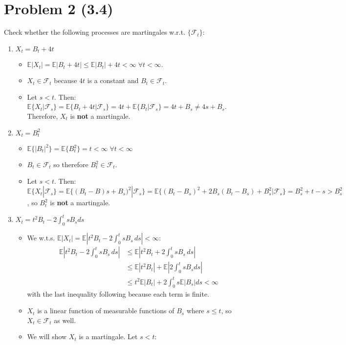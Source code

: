 \documentclass[11pt]{article}
\newcommand{\fcal}{\mathcal{F}}
\newcommand\abs[1]{\left|#1\right|}
\newcommand{\E}{\mathbb{E}}
\newcommand{\seq}[1]{\{#1\}}
\begin{document}
 \section*{Problem 2 (3.4)}
 Check whether the following processes are martingales w.r.t. $\seq{\fcal_t}$:
 \begin{enumerate}
 \item $X _ { t } = B _ { t } + 4 t$\\
 \begin{itemize}
 \item $\E \abs{X_t} = \E \abs{B_t + 4t} \leq \E \abs{B_t} + 4t < \infty \; \forall t<\infty.$
 \item $ X_t \in \fcal_t$ because $4t$ is a constant and $B_t \in \fcal_t$.
 \item Let $s<t$.  Then: $\E\{X_t|\fcal_s\}=\E\{B_t + 4t|\fcal_s\}=4t+\E\{B_t|\fcal_s\}=4t+B_s \neq 4s+ B_s$.  Therefore, $X_t$ is \textbf{not} a martingale.
 \end{itemize}
 \item $X _ { t } = B _ { t } ^ { 2 }$
 \begin{itemize}
 \item $\E\{ \abs{B_t}^2 \} = \E\{B_t^2\} = t<\infty \; \forall t<\infty$
 \item $B_t \in \fcal_t$ so therefore $B_t^2 \in \fcal_t$.
 \item  Let $s<t$.  Then: $\E\{X_t|\fcal_s\}= \E \{(B_t-B)s+B_s)^2|\fcal_s\} = \E \{ (B_t-B_s)^2 + 2 B_s(B_t-B_s) +B_s^2| \fcal_s\} = B_s^2+t-s > B_s^2$, so $B_t^2$ is \textbf{not} a martingale.
 \end{itemize}
 \item $X _ { t } = t ^ { 2 } B _ { t } - 2 \int _ { 0 } ^ { t } s B _ { s } d s$
 \begin{itemize}
 \item We w.t.s. $\E \abs{X_t} = \E\abs{t^2B_t - 2 \int_0^t sB_s \, ds}< \infty$:
 \begin{align*}
 \E \abs{t^2B_t - 2 \int_0^t sB_s \, ds}&\leq \E \abs{t^2B_t + 2 \int_0^t sB_s \, ds}\\
 & \leq \E \abs{t^2B_t}+ \E \abs{ 2 \int_0^t s B_s ds}\\
 &\leq t^2 \E \abs{ B_t} + 2\int_0^t s \E \abs{ B_s} ds < \infty
 \end{align*}
 with the last inequality following because each term is finite.
\item $X_t$ is a linear function of measurable functions of $B_s$ where $s \leq t$, so $X_t \in \fcal_t$ as well.
\item We will show $X_t$ is a martingale.  Let $s<t$:

\end{itemize}
\end{enumerate}
\end{document}
